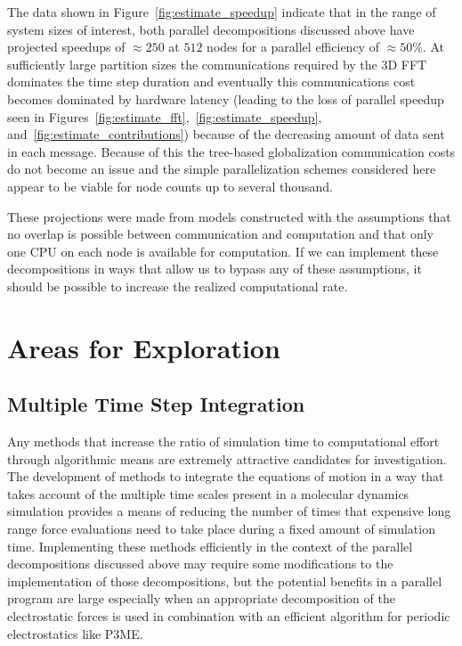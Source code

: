 \documentclass[doublespacing]{elsart}
\begin{document}
The data shown in Figure~\ref{fig:estimate_speedup} indicate that in
the range of system sizes of interest, both parallel decompositions
discussed above have projected speedups of $\approx 250$ at $512$
nodes for a parallel efficiency of $\approx 50$\%.  At sufficiently
large partition sizes the communications required by the 3D FFT
dominates the time step duration and eventually this communications
cost becomes dominated by hardware latency (leading to the loss of
parallel speedup seen in
Figures~\ref{fig:estimate_fft},~\ref{fig:estimate_speedup},
and~\ref{fig:estimate_contributions}) because of the decreasing amount
of data sent in each message.  Because of this the tree-based
globalization communication costs do not become an issue and the simple
parallelization schemes considered here appear to be viable for node
counts up to several thousand.

These projections were made from models constructed with the
assumptions that no overlap is possible between communication and
computation and that only one CPU on each node is available for
computation.  If we can implement these decompositions in ways that
allow us to bypass any of these assumptions, it should be possible to
increase the realized computational rate.

\section{Areas for Exploration}

\subsection{Multiple Time Step Integration}

Any methods that increase the ratio of simulation time to
computational effort through algorithmic means are extremely
attractive candidates for investigation.  The development of methods
to integrate the equations of motion in a way that takes account of
the multiple time scales present in a molecular dynamics simulation
provides a means of reducing the number of times that expensive long
range force evaluations need to take place during a fixed amount of
simulation time.\cite{tuckerman:92,zhou:2001} Implementing these
methods efficiently in the context of the parallel decompositions
discussed above may require some modifications to the implementation
of those decompositions, but the potential benefits in a parallel
program are large\cite{phillips:2002} especially when an appropriate
decomposition of the electrostatic forces is used in combination with
an efficient algorithm for periodic electrostatics like
P3ME.\cite{zhou:2001}
\end{document}
